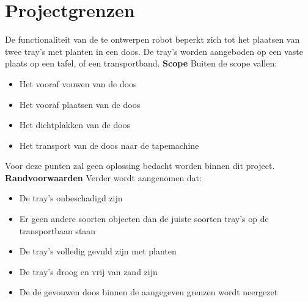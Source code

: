 
\section{Projectgrenzen}
De functionaliteit van de te ontwerpen robot beperkt zich tot het plaatsen van twee tray's met planten in een doos. De tray's worden aangeboden op een vaste plaats op een tafel, of een transportband. 
\newline
\newline
\textbf{Scope}
\newline
Buiten de scope vallen:
\begin{itemize}
 \item Het vooraf vouwen van de doos
 \item Het vooraf plaatsen van de doos
 \item Het dichtplakken van de doos
 \item Het transport van de doos naar de tapemachine
\end{itemize}
Voor deze punten zal geen oplossing bedacht worden binnen dit project.
\newline
\newline
\textbf{Randvoorwaarden}
\newline
Verder wordt aangenomen dat:
\begin{itemize}
	\item De tray's onbeschadigd zijn
	\item Er geen andere soorten objecten dan de juiste soorten tray's op de transportbaan staan
	\item De tray's volledig gevuld zijn met planten
	\item De tray's droog en vrij van zand zijn
	\item De de gevouwen doos binnen de aangegeven grenzen wordt neergezet
\end{itemize}
	
\newpage
